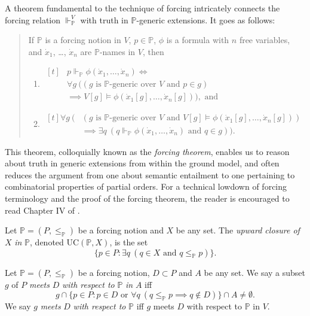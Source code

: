 \documentclass[12pt]{article}
\numberwithin{equation}{section}
\begin{document}
\begin{rem}
A theorem fundamental to the technique of forcing intricately connects the forcing relation $\Vdash_{\mathbb{P}}^V$ with truth in $\mathbb{P}$-generic extensions. It goes as follows:
\begin{quote}
If $\mathbb{P}$ is a forcing notion in $V$, $p \in \mathbb{P}$, $\phi$ is a formula with $n$ free variables, and $\dot{x}_1$, \dots, $\dot{x}_n$ are $\mathbb{P}$-names in $V$, then
\begin{enumerate}[label=(\alph*)]
    \item 
    \!
    $\begin{aligned}[t]
    & p \Vdash_{\mathbb{P}} \phi(\dot{x}_1, \dots, \dot{x}_n) \iff \\
    & \forall g \ ((g \text{ is } \mathbb{P} \text{-generic over } V \text{ and } p \in g) \\
    & \implies V[g] \models \phi(\dot{x}_1[g], \dots, \dot{x}_n[g])), \text{ and}
    \end{aligned}$
    \item 
    \!
    $\begin{aligned}[t]
    \forall g \ ( & (g \text{ is } \mathbb{P} \text{-generic over } V \text{ and } V[g] \models \phi(\dot{x}_1[g], \dots, \dot{x}_n[g])) \\
    & \implies \exists q \ (q \Vdash_{\mathbb{P}} \phi(\dot{x}_1, \dots, \dot{x}_n) \text{ and } q \in g)) \text{.}
    \end{aligned}$
\end{enumerate}
\end{quote}
This theorem, colloquially known as the \emph{forcing theorem}, enables us to reason about truth in generic extensions from within the ground model, and often reduces the argument from one about semantic entailment to one pertaining to combinatorial properties of partial orders. For a technical lowdown of forcing terminology and the proof of the forcing theorem, the reader is encouraged to read Chapter IV of \cite{kunen}. 
\end{rem}

\begin{defi}
Let $\mathbb{P} = (P, \leq_{\mathbb{P}})$ be a forcing notion and $X$ be any set. The \emph{upward closure of} $X$ \emph{in} $\mathbb{P}$, denoted $\mathrm{UC}(\mathbb{P}, X)$, is the set $$\{p \in P : \exists q \ (q \in X \text{ and } q \leq_{\mathbb{P}} p)\}.$$
\end{defi}

\begin{defi}
Let $\mathbb{P} = (P, \leq_{\mathbb{P}})$ be a forcing notion, $D \subset P$ and $A$ be any set. We say a subset $g$ of $P$ \emph{meets} $D$ \emph{with respect to} $\mathbb{P}$ \emph{in} $A$ iff $$g \cap \{p \in P : p \in D \text{ or } \forall q \ (q \leq_{\mathbb{P}} p \implies q \not\in D)\} \cap A \neq \emptyset.$$ We say $g$ \emph{meets} $D$ \emph{with respect to} $\mathbb{P}$ iff $g$ meets $D$ with respect to $\mathbb{P}$ in $V$.
\end{defi}
\end{document}
